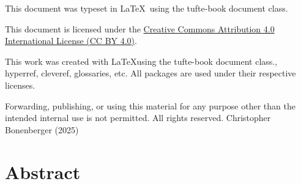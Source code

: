 
\maketitle%

\setlength{\parindent}{0pt}%
\thispagestyle{empty}
This document was typeset in \LaTeX~using the tufte-book document class. 
\vspace{2cm}

This document is licensed under the 
\href{https://creativecommons.org/licenses/by/4.0/}{Creative Commons Attribution 4.0 International License (CC BY 4.0)}.

This work was created with \LaTeX using the tufte-book document class., hyperref, cleveref, glossaries, etc.
All packages are used under their respective licenses.

Forwarding, publishing, or using this material for any purpose other than the intended internal use is not permitted.  
All rights reserved.
\vfill
Christopher Bonenberger (2025) \titleofthesis \clearpage
\setlength{\parindent}{0pt}%
\thispagestyle{empty}
\vfill

\setlength{\parindent}{0pt}%
\newpage\null

\thispagestyle{empty}
\section*{Abstract}

\setlength{\parindent}{0pt}%
\newpage\null\thispagestyle{empty}\newpage

